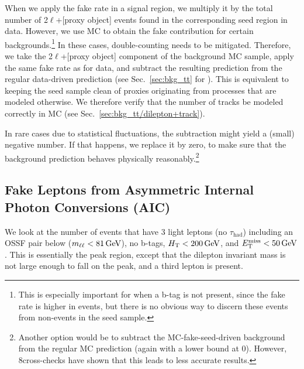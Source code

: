 When we apply the fake rate in a signal region, we multiply it by the total number of 2$\ell$+[proxy object] events found in the corresponding seed region in data. However, we use MC to obtain the fake contribution for certain backgrounds.\footnote{This is especially important for \ttbar when a b-tag is not present, since the fake rate is higher in \ttbar events, but there is no obvious way to discern these events from non-\ttbar events in the seed sample.} In these cases, double-counting needs to be mitigated. Therefore, we take the 2$\ell$+[proxy object] component of the background MC sample, apply the same fake rate as for data, and subtract the resulting prediction from the regular data-driven prediction (see \eg Sec.~\ref{sec:bkg_tt} for \ttbar). This is equivalent to keeping the seed sample clean of proxies originating from processes that are modeled otherwise. We therefore verify that the number of tracks be modeled correctly in MC (see Sec.~\ref{sec:bkg_tt/dilepton+track}).

In rare cases due to statistical fluctuations, the subtraction might yield a (small) negative number. If that happens, we replace it by zero, to make sure that the background prediction behaves physically reasonably.\footnote{Another option would be to subtract the MC-fake-seed-driven background from the regular \ttbar MC prediction (again with a lower bound at 0). However, 8\TeV cross-checks have shown that this leads to less accurate results.}


\subsection{Fake Leptons from Asymmetric Internal Photon Conversions (AIC)}
\label{sec:bkg_fakeLight/photons}
We look at the number of events that have 3 light leptons (no $\tau_\textrm{had}$) including an OSSF pair below \Z (\ie $m_{\ell\ell} < 81\,\text{Ge\hspace{-.08em}V}$), no b-tags, $H_{\mathrm{T}} < 200\,\text{Ge\hspace{-.08em}V}$, and $E_{\mathrm{T}}^{\text{miss}} < 50\,\text{Ge\hspace{-.08em}V}$. This is essentially the \Z peak region, except that the dilepton invariant mass is not large enough to fall on the \Z peak, and a third lepton is present.

